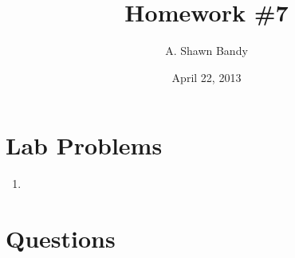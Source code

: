 \documentclass{article}
\begin{document}
\title{Homework \#7}
\author{A. Shawn Bandy}
\date{April 22, 2013}
\maketitle
	\section{Lab Problems}
		\begin{enumerate}[L1]
			\item 
			
		\end{enumerate}
\begingroup
	\section{Questions}\hfill\\
		\let\clearpage\relax
		\begin{enumerate}[Q1]
			
		\end{enumerate}
\endgroup
\end{document}
